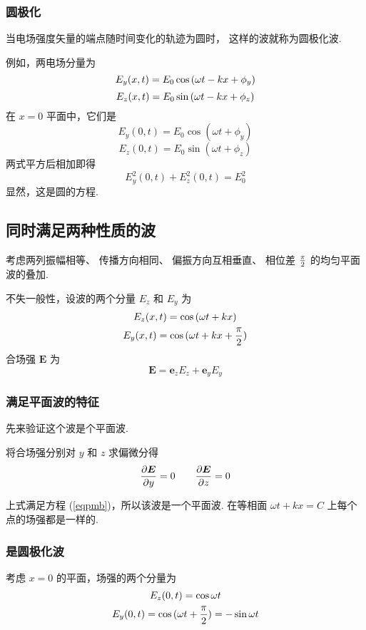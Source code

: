 \documentclass[UTF8,linespread=1.236]{ctexart}
\newcommand\myref[1]{(\ref{#1})}
\newcommand\cu[1]{\boldsymbol{#1}}
\newcommand\vecE{\cu{E}}
\newcommand\pypx[2]{{{\partial {#1}} \over {\partial {#2}}}}
\begin{document}
\subsubsection{圆极化}

当电场强度矢量的端点随时间变化的轨迹为圆时，
这样的波就称为圆极化波.

例如，两电场分量为
\begin{equation}
    E_y(x,t) = E_0\cos{(\omega t - kx + \phi_{y})}
\end{equation}
\begin{equation}
    E_z(x,t) = E_0\sin{(\omega t - kx + \phi_{z})}
\end{equation}
在 $x = 0$ 平面中，它们是
\begin{equation}
    E_y(0,t) = E_0\cos{(\omega t + \phi_y)}
\end{equation}
\begin{equation}
    E_z(0,t) = E_0\sin{(\omega t + \phi_z)}
\end{equation}
两式平方后相加即得
\begin{equation}
    E_y^2(0,t) + E_z^2(0,t) = E_0^2
\end{equation}
显然，这是圆的方程.

\subsection{同时满足两种性质的波}

考虑两列振幅相等、
传播方向相同、
偏振方向互相垂直、
相位差 $\pi \over 2$ 的均匀平面波的叠加.

不失一般性，设波的两个分量 $E_z$ 和 $E_y$ 为
\begin{gather}
    E_z(x,t) = \cos{(\omega t + kx)} \\
    E_y(x,t) = \cos{(\omega t + kx + {\pi \over 2})}
\end{gather}
合场强 $\vecE$ 为
\begin{equation}
    \vecE = \cu{e}_zE_z + \cu{e}_yE_y
\end{equation}

\subsubsection{满足平面波的特征}
先来验证这个波是个平面波.

将合场强分别对 $y$ 和 $z$ 求偏微分得
\begin{equation}
    \pypx{\vecE}{y} = 0 \qquad \pypx{\vecE}{z} = 0
\end{equation}

上式满足方程 \myref{eqpmb}，所以该波是一个平面波.
在等相面 $\omega t + kx = C$ 上每个点的场强都是一样的.

\subsubsection{是圆极化波}
考虑 $x = 0$ 的平面，场强的两个分量为
\begin{gather}
E_z(0,t) = \cos{\omega t} \\
E_y(0,t) = \cos{(\omega t + {\pi \over 2})}
= -\sin{\omega t}
\end{gather}

\clearpage
\end{document}
